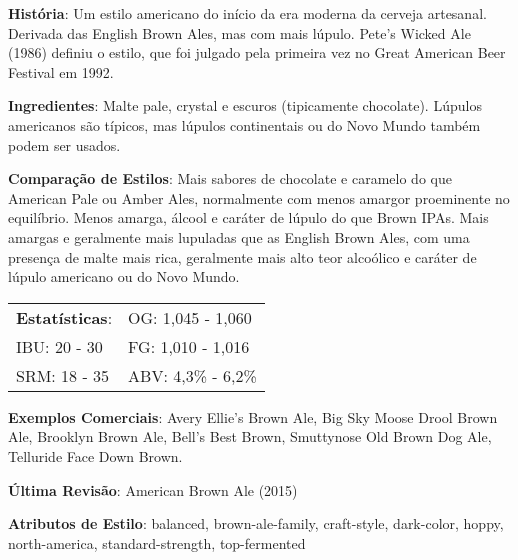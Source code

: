 \textbf{História}: Um estilo americano do início da era moderna da cerveja artesanal. Derivada das English Brown Ales, mas com mais lúpulo. Pete's Wicked Ale (1986) definiu o estilo, que foi julgado pela primeira vez no Great American Beer Festival em 1992.

\textbf{Ingredientes}: Malte pale, crystal e escuros (tipicamente chocolate). Lúpulos americanos são típicos, mas lúpulos continentais ou do Novo Mundo também podem ser usados.

\textbf{Comparação de Estilos}: Mais sabores de chocolate e caramelo do que American Pale ou Amber Ales, normalmente com menos amargor proeminente no equilíbrio. Menos amarga, álcool e caráter de lúpulo do que Brown IPAs. Mais amargas e geralmente mais lupuladas que as English Brown Ales, com uma presença de malte mais rica, geralmente mais alto teor alcoólico e caráter de lúpulo americano ou do Novo Mundo.

\begin{tabular}{@{}p{35mm}p{35mm}@{}}
  \textbf{Estatísticas}: & OG: 1,045 - 1,060 \\
  IBU: 20 - 30  & FG: 1,010 - 1,016 \\
  SRM: 18 - 35  & ABV: 4,3\% - 6,2\%
\end{tabular}

\textbf{Exemplos Comerciais}: Avery Ellie’s Brown Ale, Big Sky Moose Drool Brown Ale, Brooklyn Brown Ale, Bell’s Best Brown, Smuttynose Old Brown Dog Ale, Telluride Face Down Brown.

\textbf{Última Revisão}: American Brown Ale (2015)

\textbf{Atributos de Estilo}: balanced, brown-ale-family, craft-style, dark-color, hoppy, north-america, standard-strength, top-fermented
